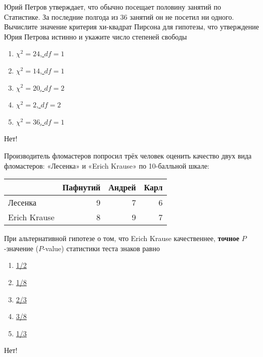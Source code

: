 \documentclass[t]{beamer}
\begin{document}
 \begin{frame} \label{23-No} 
\begin{block}{23} 

 Юрий Петров утверждает, что обычно посещает половину занятий по Статистике. За последние полгода из 36 занятий он не посетил ни одного. Вычислите значение критерия хи-квадрат Пирсона для гипотезы, что утверждение Юрия Петрова истинно и укажите число степеней свободы
  


 \end{block} 
\begin{enumerate} 
\item[] \hyperlink{23-No}{\beamergotobutton{} $\chi^2 = 24$, $df=1$}
\item[] \hyperlink{23-No}{\beamergotobutton{} $\chi^2 = 14$, $df=1$}
\item[] \hyperlink{23-No}{\beamergotobutton{} $\chi^2 = 20$, $df=2$}
\item[] \hyperlink{23-No}{\beamergotobutton{} $\chi^2 = 2$, $df=2$}
\item[] \hyperlink{23-Yes}{\beamergotobutton{} $\chi^2 = 36$, $df=1$}
\end{enumerate} 

 \alert{Нет!} 
\end{frame} 


 \begin{frame} \label{24-No} 
\begin{block}{24} 

  Производитель фломастеров попросил трёх человек оценить качество двух вида фломастеров: «Лесенка» и «Erich Krause» по 10-балльной шкале:

\begin{center}
\begin{tabular}{lrrr} \toprule
 & Пафнутий & Андрей & Карл \\
\midrule
Лесенка & 9 & 7 & 6 \\
Erich Krause & 8 & 9 & 7 \\
\bottomrule
\end{tabular}
\end{center}

При альтернативной гипотезе о том, что Erich Krause качественнее, \textbf{точное} $P$-значение ($P$-value) статистики теста знаков равно

  


 \end{block} 
\begin{enumerate} 
\item[] \hyperlink{24-Yes}{\beamergotobutton{} 1/2}
\item[] \hyperlink{24-No}{\beamergotobutton{} 1/8}
\item[] \hyperlink{24-No}{\beamergotobutton{} 2/3}
\item[] \hyperlink{24-No}{\beamergotobutton{} 3/8}
\item[] \hyperlink{24-No}{\beamergotobutton{} 1/3}
\end{enumerate} 

 \alert{Нет!} 
\end{frame} 
\end{document}
